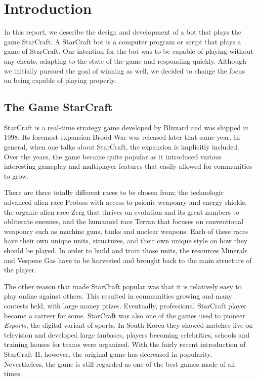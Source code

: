 
\chapter{Introduction}

In this report, we describe the design and development of a bot that plays the game StarCraft. A StarCraft bot is a computer program or script that plays a game of StarCraft. Our intention for the bot was to be capable of playing without any cheats, adapting to the state of the game and responding quickly. Although we initially pursued the goal of winning as well, we decided to change the focus on being capable of playing properly.

\section{The Game StarCraft}

StarCraft is a real-time strategy game developed by Blizzard and was shipped in 1998. Its foremost expansion Brood War was released later that same year. In general, when one talks about StarCraft, the expansion is implicitly included. Over the years, the game became quite popular as it introduced various interesting gameplay and multiplayer features that easily allowed for communities to grow.

There are three totally different races to be chosen from; the technologic advanced alien race Protoss with access to psionic weaponry and energy shields, the organic alien race Zerg that thrives on evolution and its great numbers to obliterate enemies, and the humanoid race Terran that focuses on conventional weaponry such as machine guns, tanks and nuclear weapons. Each of these races have their own unique units, structures, and their own unique style on how they should be played. In order to build and train those units, the resources Minerals and Vespene Gas have to be harvested and brought back to the main structure of the player.

The other reason that made StarCraft popular was that it is relatively easy to play online against others. This resulted in communities growing and many contests held, with large money prizes. Eventually, professional StarCraft player became a carreer for some. StarCraft was also one of the games used to pioneer \emph{Esports}, the digital variant of sports. In South Korea they showed matches live on television and developed large fanbases, players becoming celebrities, schools and training houses for teams were organized. With the fairly recent introduction of StarCraft II, however, the original game has decreased in popularity. Nevertheless, the game is still regarded as one of the best games made of all times.

